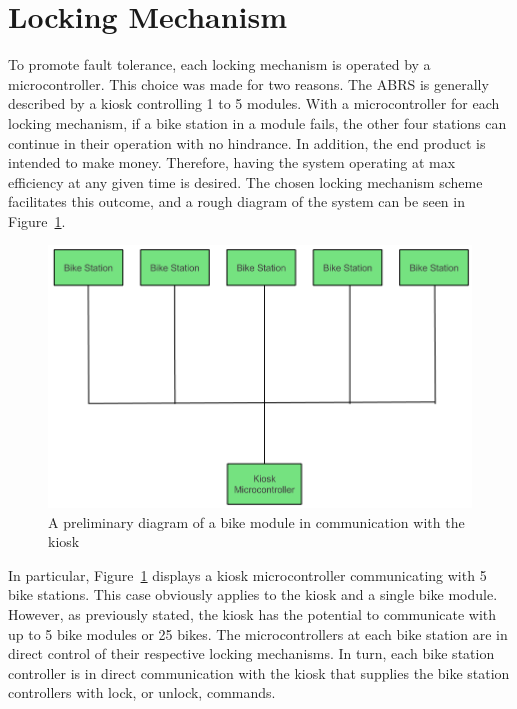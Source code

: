 \documentclass[11pt,a4paper,onesides]{report}
\begin{document}
\section{Locking Mechanism}
\label{sec:locking-mechanism}

To promote fault tolerance, each locking mechanism is operated by a microcontroller.  This choice was made for two reasons.  The ABRS is generally described by a kiosk controlling 1 to 5 modules.  With a microcontroller for each locking mechanism, if a bike station in a module fails, the other four stations can continue in their operation with no hindrance.  In addition, the end product is intended to make money.  Therefore, having the system operating at max efficiency at any given time is desired.  The chosen locking mechanism scheme facilitates this outcome, and a rough diagram of the system can be seen in Figure~\ref{fig:module-block-diagram}. 

\begin{figure}[h]
	\begin{center}
		\includegraphics[scale = 0.45]{module-block-diagram}
	\end{center}
      \label{fig:module-block-diagram}
\caption{A preliminary diagram of a bike module in communication with the kiosk}
\end{figure}

In particular, Figure~\ref{fig:module-block-diagram} displays a kiosk microcontroller communicating with 5 bike stations.  This case obviously applies to the kiosk and a single bike module.  However, as previously stated, the kiosk has the potential to communicate with up to 5 bike modules or 25 bikes.  The microcontrollers at each bike station are in direct control of their respective locking mechanisms.  In turn, each bike station controller is in direct communication with the kiosk that supplies the bike station controllers with lock, or unlock, commands.
\end{document}
